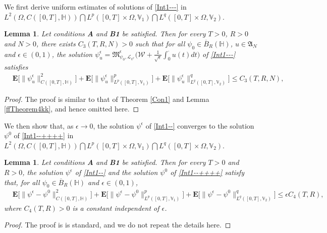 \documentclass[11pt]{article}
\renewcommand{\leq}{\leqslant}
\newtheorem{lemma}[theorem]{Lemma}
\numberwithin{equation}{section}
\begin{document}
We first derive uniform estimates of solutions of \eqref{Int1---} in  $L^2(\Omega, C([0,T],\mathbb{H}))\bigcap L^p([0,T]\times\Omega, \mathbb{V}_1)\bigcap L^q([0,T]\times\Omega, \mathbb{V}_2)$.

\begin{lemma}\label{SCE1}
Let conditions  {\bf A} and {\bf B1}
be satisfied. Then for every $T>0$, $R>0$ and $N>0$, there exists $C_3(T,R,N)>0$ such that for all $\psi_{0}\in \overline{B}_{R}(\mathbb{H})$, $u\in \mathfrak{A}_N$ and $\epsilon\in(0,1)$,
the solution $\psi^\epsilon_u=\mathfrak{M}_{\psi_0,\mathcal{L}_{\psi^\epsilon}}^\epsilon
\Big(\mathcal{W}+\frac{1}{\sqrt{\epsilon}}
\int_0^\cdot u(t)dt\Big)$ of \eqref{Int1---} satisfies
\begin{align*}
&\mathbf{E}\Big[\|\psi^\epsilon_u
\|^2_{C([0,T],\mathbb{H} )}\Big]+\mathbf{E}\Big[
\|\psi^\epsilon_u\|^p_{L^p([0,T],\mathbb{V}_1 )}\Big]+\mathbf{E}\Big[\|\psi^\epsilon_u\|^q_{L^q([0,T], \mathbb{V}_2)}\Big]\leq C_3(T,R, N),
\end{align*}
\end{lemma}
\begin{proof}
The proof is similar to that of Theorem \ref{Con1}  and  Lemma  \ref{ffTheorem4kk},
and hence omitted here.
\end{proof}

We then show that, as $\epsilon\rightarrow0$, the solution  $\psi^\epsilon$ of \eqref{Int1--} converges to the solution $\psi^0$ of \eqref{Int1--++++} in $L^2(\Omega, C([0,T],\mathbb{H}) )\bigcap L^p([0,T]\times\Omega, \mathbb{V}_1)\bigcap L^q([0,T]\times\Omega, \mathbb{V}_2)$.
\begin{lemma}\label{SCE2}
Let conditions  {\bf A} and {\bf B1}
be satisfied. Then for every $T>0$ and $R>0$,
the solution  $\psi^\epsilon$ of \eqref{Int1--} and the solution $\psi^0$
of \eqref{Int1--++++}  satisfy that, for all $\psi_{0}\in \overline{B}_{R}(\mathbb{H})$ and $\epsilon\in(0,1)$,
\begin{align*}
&\mathbf{E}\Big[\|\psi^\epsilon-\psi^0
\|^2_{C([0,T],\mathbb{H} )}\Big]
+\mathbf{E}\Big[
\|\psi^\epsilon-\psi^0\|^p_{L^p([0,T],\mathbb{V}_1 )}\Big]+\mathbf{E}\Big[\|\psi^\epsilon-\psi^0\|^q_{L^q([0,T], \mathbb{V}_2)}\Big]
\leq \epsilon C_4(T,R),
\end{align*}
where $C_4(T,R)>0$ is a constant
independent of $\epsilon$.
\end{lemma}
\begin{proof}
The proof is is standard,  and we   do not
repeat  the details  here.
\end{proof}
\end{document}
